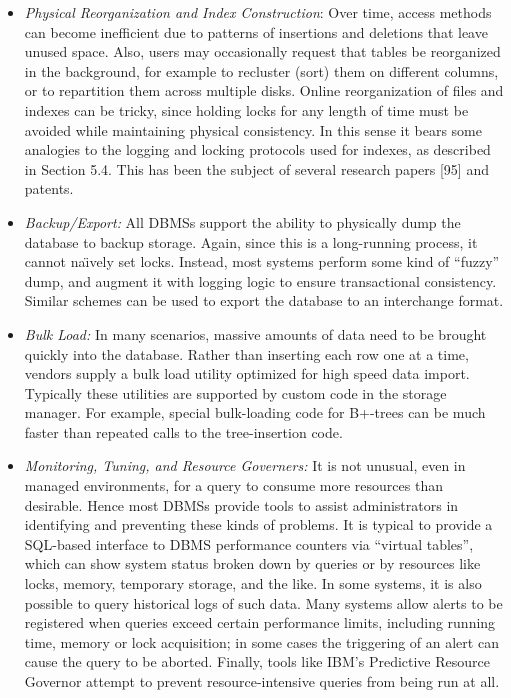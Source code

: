 \documentclass[b5paper,11pt,twoside,openright]{book}
\begin{document}
\begin{itemize}
\item
  \emph{Physical Reorganization and Index Construction}: Over time,
  access methods can become inefficient due to patterns of insertions
  and deletions that leave unused space. Also, users may occasionally
  request that tables be reorganized in the background, for example to
  recluster (sort) them on different columns, or to repartition them
  across multiple disks. Online reorganization of files and indexes can
  be tricky, since holding locks for any length of time must be avoided
  while maintaining physical consistency. In this sense it bears some
  analogies to the logging and locking protocols used for indexes, as
  described in Section 5.4. This has been the subject of several
  research papers {[}95{]} and patents.
\item
  \emph{Backup/Export:} All DBMSs support the ability to physically
  dump the database to backup storage. Again, since this is a
  long-running process, it cannot na{\"\i}vely set locks. Instead, most
  systems perform some kind of ``fuzzy'' dump, and augment it with
  logging logic to ensure transactional consistency. Similar schemes can
  be used to export the database to an interchange format.
\item
  \emph{Bulk Load:} In many scenarios, massive amounts of data need to
  be brought quickly into the database. Rather than inserting each row
  one at a time, vendors supply a bulk load utility optimized for high
  speed data import. Typically these utilities are supported by custom
  code in the storage manager. For example, special bulk-loading code
  for B+-trees can be much faster than repeated calls to the
  tree-insertion code.
\item
  \emph{Monitoring, Tuning, and Resource Governers:} It is not unusual,
  even in managed environments, for a query to consume more resources
  than desirable. Hence most DBMSs provide tools to assist
  administrators in identifying and preventing these kinds of problems.
  It is typical to provide a SQL-based interface to DBMS performance
  counters via ``virtual tables'', which can show system status broken
  down by queries or by resources like locks, memory, temporary storage,
  and the like. In some systems, it is also possible to query historical
  logs of such data. Many systems allow alerts to be registered when
  queries exceed certain performance limits, including running time,
  memory or lock acquisition; in some cases the triggering of an alert
  can cause the query to be aborted. Finally, tools like IBM's
  Predictive Resource Governor attempt to prevent resource-intensive
  queries from being run at all.
\end{itemize}
\end{document}
